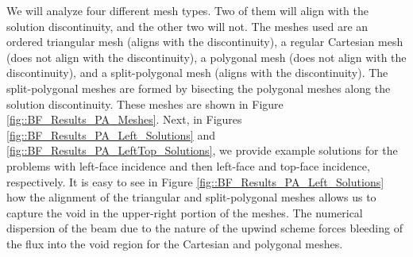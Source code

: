 We will analyze four different mesh types. Two of them will align with the solution discontinuity, and the other two will not. The meshes used are an ordered triangular mesh (aligns with the discontinuity), a regular Cartesian mesh (does not align with the discontinuity), a polygonal mesh (does not align with the discontinuity), and a split-polygonal mesh (aligns with the discontinuity). The split-polygonal meshes are formed by bisecting the polygonal meshes along the solution discontinuity. These meshes are shown in Figure \ref{fig::BF_Results_PA_Meshes}. Next, in Figures \ref{fig::BF_Results_PA_Left_Solutions} and \ref{fig::BF_Results_PA_LeftTop_Solutions}, we provide example solutions for the problems with left-face incidence and then left-face and top-face incidence, respectively. It is easy to see in Figure \ref{fig::BF_Results_PA_Left_Solutions} how the alignment of the triangular and split-polygonal meshes allows us to capture the void in the upper-right portion of the meshes. The numerical dispersion of the beam due to the nature of the upwind scheme forces bleeding of the flux into the void region for the Cartesian and polygonal meshes.

